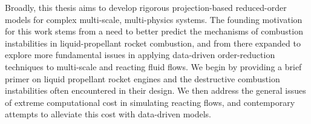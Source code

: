 
Broadly, this thesis aims to develop rigorous projection-based reduced-order models for complex multi-scale, multi-physics systems. The founding motivation for this work stems from a need to better predict the mechanisms of combustion instabilities in liquid-propellant rocket combustion, and from there expanded to explore more fundamental issues in applying data-driven order-reduction techniques to multi-scale and reacting fluid flows. We begin by providing a brief primer on liquid propellant rocket engines and the destructive combustion instabilities often encountered in their design. We then address the general issues of extreme computational cost in simulating reacting flows, and contemporary attempts to alleviate this cost with data-driven models.
